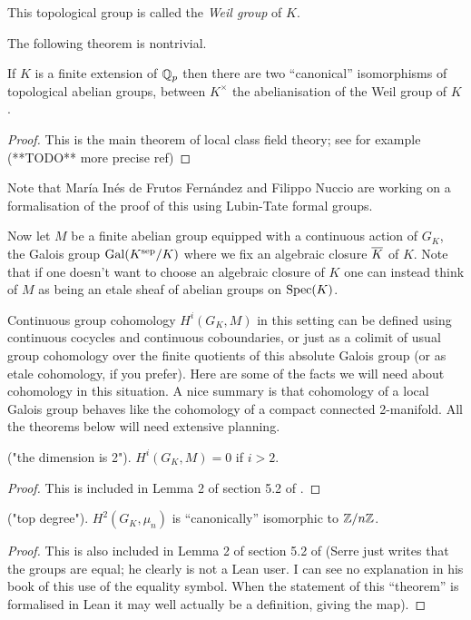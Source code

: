 \begin{definition}\label{local_Weil_group} This topological group is called the \emph{Weil group} of $K$.
\end{definition}

The following theorem is nontrivial.

\begin{theorem} If $K$ is a finite extension of $\mathbb{Q}_p$ then there are two ``canonical'' isomorphisms of topological abelian groups, between $K^\times$ the abelianisation of the Weil group of $K$.
\end{theorem}
\begin{proof} This is the main theorem of local class field theory; see for example~\cite{cf} (**TODO** more precise ref) 
\end{proof}

Note that Mar\'ia In\'es de Frutos Fern\'andez and Filippo Nuccio are working on a formalisation of the proof of this using Lubin-Tate formal groups.

Now let $M$ be a finite abelian group equipped with a continuous action of $G_K$, the Galois group $\operatorname{Gal}(K^{\operatorname{sep}}/K)$ where we fix an algebraic closure $\overline{K}$ of $K$. Note that if one doesn't want to choose an algebraic closure of $K$ one can instead think of $M$ as being an etale sheaf of abelian groups on $\operatorname{Spec}(K)$.

Continuous group cohomology $H^i(G_K,M)$ in this setting can be defined using continuous cocycles and continuous coboundaries, or just as a colimit of usual group cohomology over the finite quotients of this absolute Galois group (or as etale cohomology, if you prefer). Here are some of the facts we will need about cohomology in this situation. A nice summary is that cohomology of a local Galois group behaves like the cohomology of a compact connected 2-manifold. All the theorems below will need extensive planning.

\begin{theorem} ("the dimension is 2"). $H^i(G_K,M)=0$ if $i>2$.
\end{theorem}
\begin{proof} This is included in Lemma 2 of section 5.2 of \cite{serre-galcoh}.
\end{proof}

\begin{theorem} ("top degree"). $H^2(G_K,\mu_n)$ is ``canonically'' isomorphic to $\mathbb{Z}/n\mathbb{Z}$.
\end{theorem}
\begin{proof} This is also included in Lemma 2 of section 5.2 of \cite{serre-galcoh} (Serre just writes that the groups are equal; he clearly is not a Lean user. I can see no explanation in his book of this use of the equality symbol. When the statement of this ``theorem'' is formalised in Lean it may well actually be a definition, giving the map).
\end{proof}

